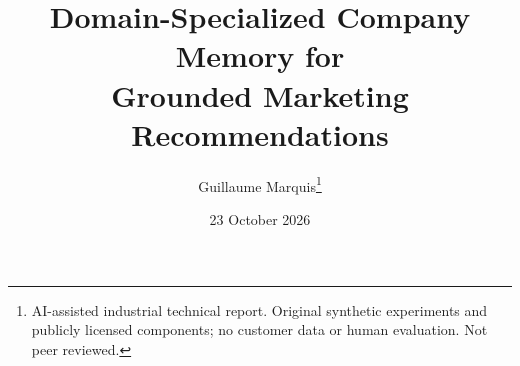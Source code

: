 \documentclass[11pt]{article}
\title{Domain-Specialized Company Memory for\\ Grounded Marketing Recommendations}
\author{Guillaume Marquis\thanks{AI-assisted industrial technical report. Original synthetic experiments and publicly licensed components; no customer data or human evaluation. Not peer reviewed.}}
\date{23 October 2026}
\begin{document}
\maketitle
\begin{abstract}

\end{abstract}






\begingroup
\small
\setlength{\bibsep}{4pt}


\endgroup
\clearpage
\appendix

\end{document}
